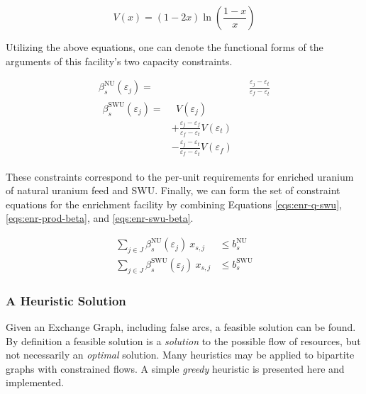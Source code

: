\begin{equation}\label{eqs:value}
  V(x) = (1-2x) \ln \left(\frac{1-x}{x}\right)
\end{equation}

Utilizing the above equations, one can denote the functional forms of the
arguments of this facility's two capacity constraints.

\begin{align}
\label{eqs:enr-prod-beta}
\beta_{s}^{\text{NU}}(\varepsilon_{j}) = & \:\: \frac{\varepsilon_{j} - \varepsilon_{t}}
                                      {\varepsilon_{f} - \varepsilon_{t}} \\
\begin{split}
\label{eqs:enr-swu-beta}
\beta_{s}^{\text{SWU}}(\varepsilon_{j}) = & \:\: V(\varepsilon_{j}) \\
                         & + \frac{\varepsilon_{j} - \varepsilon_{f}}
                                  {\varepsilon_{f} - \varepsilon_{t}} V(\varepsilon_{t}) \\
                         & - \frac{\varepsilon_{j} - \varepsilon_{t}}
                                  {\varepsilon_{f} - \varepsilon_{t}} V(\varepsilon_{f})
\end{split}
\end{align}

These constraints correspond to the per-unit requirements for enriched uranium
of natural uranium feed and SWU. Finally, we can form the set of constraint
equations for the enrichment facility by combining Equations
\ref{eqs:enr-q-swu}, \ref{eqs:enr-prod-beta}, and \ref{eqs:enr-swu-beta}.

\begin{align}
\label{eqs:enr-prod-constr}
\sum_{j \in J}\beta_{s}^{\text{NU}}(\varepsilon_{j}) \: x_{s,j}  & \leq b_{s}^{\text{NU}} \\
\label{eqs:enr-swu-constr}
\sum_{j \in J}\beta_{s}^{\text{SWU}}(\varepsilon_{j}) \: x_{s,j} & \leq b_{s}^{\text{SWU}}
\end{align}

\subsubsection{A Heuristic Solution}\label{abm:dre:nfctp:heur}

Given an Exchange Graph, including false arcs, a feasible solution can be
found. By definition a feasible solution is a \textit{solution} to the possible
flow of resources, but not necessarily an \textit{optimal} solution. Many
heuristics may be applied to bipartite graphs with constrained flows. A simple
\textit{greedy} heuristic is presented here and implemented.

